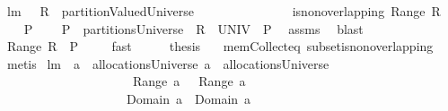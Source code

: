 \begin{isabellebody}
%
\endisadelimproof
\isanewline
{}\isamarkupfalse%
\ lm{}{}{\isacharcolon}\ \ \ {\isachardoublequoteopen}R\ {\isasymin}\ partitionValuedUniverse{\isachardoublequoteclose}\ \isanewline
\ \ \ \ \ \ \ \ \ \ \ \ \ \ {\isachardoublequoteopen}is{\isacharunderscore}non{\isacharunderscore}overlapping\ {\isacharparenleft}Range\ R{\isacharparenright}{\isachardoublequoteclose}\isanewline
%
\isadelimproof
%
\endisadelimproof
%
\isatagproof
{}\isamarkupfalse%
\ {\isacharminus}\isanewline
\ \ \isamarkupfalse%
\ P\ \isanewline
\ \ {}{\isacharcolon}\ {\isachardoublequoteopen}P\ {\isasymin}\ partitionsUniverse\ {\isacharampersand}\ R\ {\isasymsubseteq}\ UNIV\ {\isasymtimes}\ P{\isachardoublequoteclose}\ \isamarkupfalse%
\ assms\ \isamarkupfalse%
\ blast\isanewline
\ \ \isamarkupfalse%
\ {\isachardoublequoteopen}Range\ R\ {\isasymsubseteq}\ P{\isachardoublequoteclose}\ \isamarkupfalse%
\ {}\ \isamarkupfalse%
\ fast\isanewline
\ \ \isamarkupfalse%
\ \isamarkupfalse%
\ {\isacharquery}thesis\ \isamarkupfalse%
\ {}\ mem{\isacharunderscore}Collect{\isacharunderscore}eq\ subset{\isacharunderscore}is{\isacharunderscore}non{\isacharunderscore}overlapping\ \isamarkupfalse%
\ {\isacharparenleft}metis{\isacharparenright}\isanewline
{}\isamarkupfalse%
%
\endisatagproof
{\isafoldproof}%
%
\isadelimproof
\isanewline
%
\endisadelimproof
\isanewline
{}\isamarkupfalse%
\ lm{}{}{\isacharcolon}\ \ {\isachardoublequoteopen}a{}\ {\isasymin}\ allocationsUniverse{\isachardoublequoteclose}\ {\isachardoublequoteopen}a{}\ {\isasymin}\ allocationsUniverse{\isachardoublequoteclose}\ \isanewline
\ \ \ \ \ \ \ \ \ \ \ \ \ \ \ \ \ \ \ \ {\isachardoublequoteopen}{\isacharparenleft}{\isasymUnion}\ {\isacharparenleft}Range\ a{}{\isacharparenright}{\isacharparenright}\ {\isasyminter}\ {\isacharparenleft}{\isasymUnion}\ {\isacharparenleft}Range\ a{}{\isacharparenright}{\isacharparenright}\ {\isacharequal}\ {\isacharbraceleft}{\isacharbraceright}{\isachardoublequoteclose}\isanewline
\ \ \ \ \ \ \ \ \ \ \ \ \ \ \ \ \ \ \ \ {\isachardoublequoteopen}{\isacharparenleft}Domain\ a{}{\isacharparenright}\ {\isasyminter}\ {\isacharparenleft}Domain\ a{}{\isacharparenright}\ {\isacharequal}\ {\isacharbraceleft}{\isacharbraceright}{\isachardoublequoteclose}\ \isanewline

\end{isabellebody}
